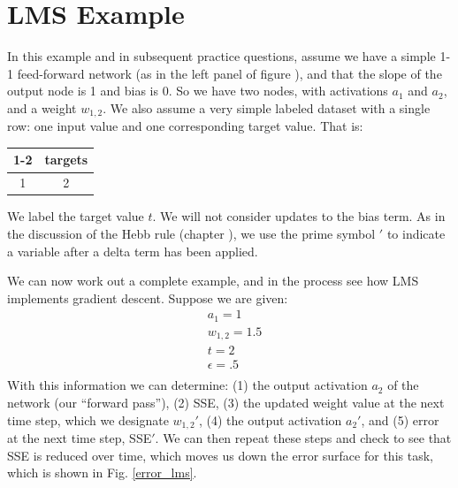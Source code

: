 

\section{LMS Example}\label{lms_example}

In this example and in subsequent practice questions, assume we have a  simple 1-1 feed-forward network  (as in the left panel of figure ), and that the slope of the output node is 1 and bias is 0. So we have two nodes, with activations $a_1$ and $a_2$, and a weight $w_{1,2}$. We also assume a very simple labeled dataset with a single row: one input value and one corresponding target value. That is:
\begin{center}
\begin{tabular}{| c || c | }
\cline{1-2}
\multicolumn{1}{| c || }{inputs}
 & \multicolumn{1}{c|}{targets} \\
\hline
  1 & 2  \\
\hline
\end{tabular}
\end{center}
We label the target value $t$. We will not consider updates to the bias term. As in the discussion of the Hebb rule (chapter ), we use the prime symbol $'$ to indicate a variable after a delta term has been applied.

We can now work out a complete example, and in the process see how LMS implements gradient descent. Suppose we are given:
\begin{eqnarray*}
& a_1 = 1 \\
& w_{1,2} = 1.5 \\
& t = 2  \\
& \epsilon = .5  \\
\end{eqnarray*}
With this information we can determine: (1) the output activation $a_2$ of the network (our ``forward pass''), (2) SSE, (3) the updated weight value at the next time step, which we designate $w_{1,2}'$, (4) the output activation $a_2'$, and (5) error at the next time step, SSE$'$. We can then repeat these steps and check to see that SSE is reduced over time, which moves us down the error surface for this task, which is shown in Fig. \ref{error_lms}.

